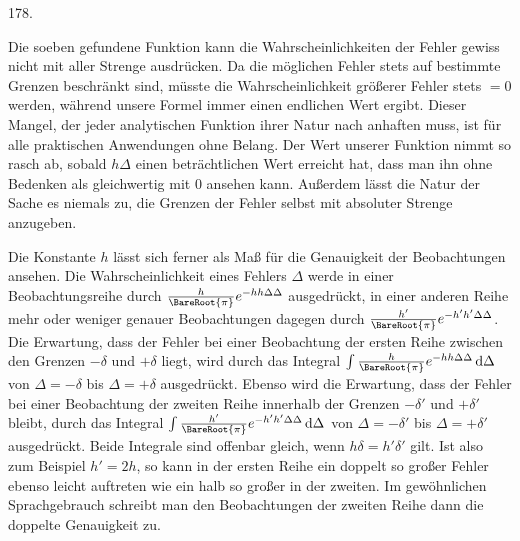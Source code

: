 \begin{center}\hypertarget{native-250-article178}{}178.\end{center}
Die soeben gefundene Funktion kann die Wahrscheinlichkeiten der Fehler gewiss nicht mit aller Strenge ausdrücken. Da die möglichen Fehler stets auf bestimmte Grenzen beschränkt sind, müsste die Wahrscheinlichkeit größerer Fehler stets $=0$ werden, während unsere Formel immer einen endlichen Wert ergibt. Dieser Mangel, der jeder analytischen Funktion ihrer Natur nach anhaften muss, ist für alle praktischen Anwendungen ohne Belang. Der Wert unserer Funktion nimmt so rasch ab, sobald $h\Delta$ einen beträchtlichen Wert erreicht hat, dass man ihn ohne Bedenken als gleichwertig mit $0$ ansehen kann. Außerdem lässt die Natur der Sache es niemals zu, die Grenzen der Fehler selbst mit absoluter Strenge anzugeben.

Die Konstante $h$ lässt sich ferner als Maß für die Genauigkeit der Beobachtungen ansehen. Die Wahrscheinlichkeit eines Fehlers $\Delta$ werde in einer Beobachtungsreihe durch $\frac{h}{\BareRoot{\pi}}e^{-hh\Delta\Delta}$ ausgedrückt, in einer anderen Reihe mehr oder weniger genauer Beobachtungen dagegen durch $\frac{h'}{\BareRoot{\pi}}e^{-h'h'\Delta\Delta}$. Die Erwartung, dass der Fehler bei einer Beobachtung der ersten Reihe zwischen den Grenzen $-\delta$ und $+\delta$ liegt, wird durch das Integral $\int\frac{h}{\BareRoot{\pi}}e^{-hh\Delta\Delta}\,\mathrm{d}\Delta$ von $\Delta=-\delta$ bis $\Delta=+\delta$ ausgedrückt. Ebenso wird die Erwartung, dass der Fehler bei einer Beobachtung der zweiten Reihe innerhalb der Grenzen $-\delta'$ und $+\delta'$ bleibt, durch das Integral $\int\frac{h'}{\BareRoot{\pi}}e^{-h'h'\Delta\Delta}\,\mathrm{d}\Delta$ von $\Delta=-\delta'$ bis $\Delta=+\delta'$ ausgedrückt. Beide Integrale sind offenbar gleich, wenn $h\delta=h'\delta'$ gilt. Ist also zum Beispiel $h'=2h$, so kann in der ersten Reihe ein doppelt so großer Fehler ebenso leicht auftreten wie ein halb so großer in der zweiten. Im gewöhnlichen Sprachgebrauch schreibt man den Beobachtungen der zweiten Reihe dann die doppelte Genauigkeit zu.
